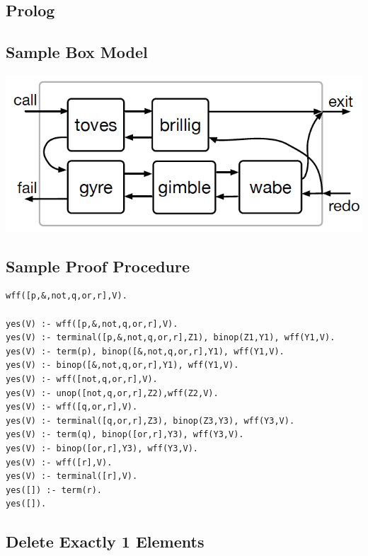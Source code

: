\documentclass[10pt,landscape,a4paper]{article}
\begin{document}
\tiny


\begin{multicols*}{5}

\section{Prolog}

\subsection*{Sample Box Model}
\includegraphics[scale=0.15]{box_model}

\subsection*{Sample Proof Procedure}
\begin{verbatim}
wff([p,&,not,q,or,r],V).

yes(V) :- wff([p,&,not,q,or,r],V).
yes(V) :- terminal([p,&,not,q,or,r],Z1), binop(Z1,Y1), wff(Y1,V).
yes(V) :- term(p), binop([&,not,q,or,r],Y1), wff(Y1,V).
yes(V) :- binop([&,not,q,or,r],Y1), wff(Y1,V).
yes(V) :- wff([not,q,or,r],V).
yes(V) :- unop([not,q,or,r],Z2),wff(Z2,V).
yes(V) :- wff([q,or,r],V).
yes(V) :- terminal([q,or,r],Z3), binop(Z3,Y3), wff(Y3,V).
yes(V) :- term(q), binop([or,r],Y3), wff(Y3,V).
yes(V) :- binop([or,r],Y3), wff(Y3,V).
yes(V) :- wff([r],V).
yes(V) :- terminal([r],V).
yes([]) :- term(r).
yes([]).
\end{verbatim}

\subsection*{Delete Exactly 1 Elements}


\end{multicols*}
\end{document}
